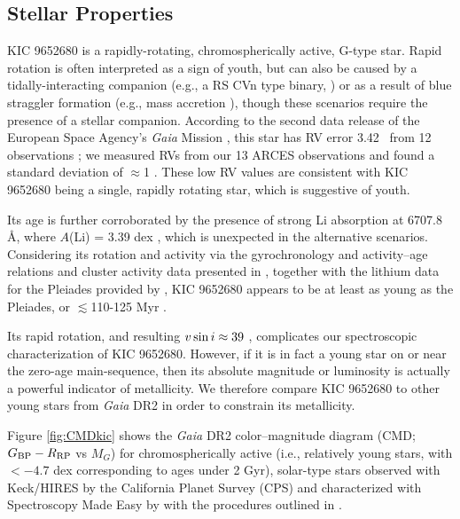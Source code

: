 \subsection{Stellar Properties}
%
KIC 9652680 is a rapidly-rotating, 
chromospherically active, G-type star. 
Rapid rotation is often interpreted as a sign of youth, 
but can also be caused by a tidally-interacting companion (e.g., a RS CVn type binary, \citealt{Eaton1979})
or as a result of blue straggler formation (e.g., mass accretion \citealt{bluestraggler}), 
though these scenarios require the presence of a stellar companion. 
According to the 
second data release of the European Space Agency's \textit{Gaia} Mission \citep[DR2][]{GaiaDR2}, 
this star has RV error 3.42 \kms\ from 12 observations
\citep{DR2RV1, DR2RV2}; 
we measured RVs from our 13 ARCES observations and found a 
standard deviation of $\approx$1 \kms. These low RV values 
are consistent with KIC 9652680 being a single, rapidly rotating star, 
which is suggestive of youth. 

Its age is further corroborated by the presence of strong Li absorption at 6707.8 \AA, where $A$(Li) = 3.39 dex \citep{Honda2015}, which is unexpected in the alternative scenarios.
Considering its rotation and activity via the gyrochronology and activity--age relations 
and cluster activity data presented in \citet{Mamajek2008}, 
together with the lithium data for the Pleiades provided by  \citet{Bouvier2018}, 
KIC 9652680 appears to be at least as young 
as the Pleiades, or $\lesssim$110-125 Myr \citep{DR2HRD, Stauffer1998}. 

Its rapid rotation, and resulting $v \sin i \approx 39$ \kms,
complicates our spectroscopic characterization of KIC 9652680.
However, if it is in fact a young star 
on or near the zero-age main-sequence, 
then its absolute magnitude or luminosity is 
actually a powerful indicator of metallicity.
We therefore compare KIC 9652680 to other young stars from \textit{Gaia} DR2 in order to constrain its metallicity. 

Figure \ref{fig:CMDkic} shows 
the \textit{Gaia} DR2 color--magnitude diagram (CMD; $G_{\rm BP} - R_{\rm RP}$ vs $M_G$)
for chromospherically active (i.e., relatively young stars, 
with \logrprime $< -4.7$ dex corresponding to ages under 2 Gyr),
solar-type stars observed with Keck/HIRES 
by the California Planet Survey (CPS) and characterized with 
Spectroscopy Made Easy \citep[SME;][]{sme, Valenti2005, Piskunov2017}
by \citet{Brewer2016} with the procedures outlined in \citet{Brewer2015}.


